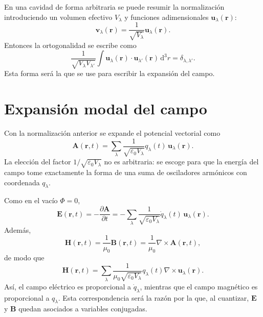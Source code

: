 \documentclass[11pt]{article}
\newcommand{\dd}{\mathrm{d}}
\newcommand{\vb}[1]{\mathbf{#1}}
\begin{document}
En una cavidad de forma arbitraria se puede resumir la normalizaci\'on
introduciendo un volumen efectivo $V_\lambda$ y funciones adimensionales
$\vb u_\lambda(\vb r)$:
\begin{equation}
  \vb v_\lambda(\vb r)
  =
  \frac{1}{\sqrt{V_\lambda}}\vb u_\lambda(\vb r).
\end{equation}
Entonces la ortogonalidad se escribe como
\begin{equation}
  \frac{1}{\sqrt{V_\lambda V_{\lambda'}}}
  \int
  \vb u_\lambda(\vb r)\cdot
  \vb u_{\lambda'}(\vb r)\,\dd^3r
  =
  \delta_{\lambda,\lambda'}.
\end{equation}
Esta forma ser\'a la que se use para escribir la expansi\'on del campo.

\section{Expansi\'on modal del campo}

Con la normalizaci\'on anterior se expande el potencial vectorial como
\begin{equation}
  \vb A(\vb r,t)
  =
  \sum_\lambda
  \frac{1}{\sqrt{\varepsilon_0V_\lambda}}
  q_\lambda(t)\,
  \vb u_\lambda(\vb r).
\end{equation}
La elecci\'on del factor $1/\sqrt{\varepsilon_0V_\lambda}$ no es arbitraria:
se escoge para que la energ\'ia del campo tome exactamente la forma de una
suma de osciladores arm\'onicos con coordenada $q_\lambda$.

Como en el vac\'io $\Phi=0$,
\begin{equation}
  \vb E(\vb r,t)
  =
  -\frac{\partial\vb A}{\partial t}
  =
  -\sum_\lambda
  \frac{1}{\sqrt{\varepsilon_0V_\lambda}}
  \dot q_\lambda(t)\,
  \vb u_\lambda(\vb r).
\end{equation}
Adem\'as,
\begin{equation}
  \vb H(\vb r,t)
  =
  \frac{1}{\mu_0}\vb B(\vb r,t)
  =
  \frac{1}{\mu_0}\nabla\times\vb A(\vb r,t),
\end{equation}
de modo que
\begin{equation}
  \vb H(\vb r,t)
  =
  \sum_\lambda
  \frac{1}{\mu_0\sqrt{\varepsilon_0V_\lambda}}
  q_\lambda(t)
  \nabla\times\vb u_\lambda(\vb r).
\end{equation}
As\'i, el campo el\'ectrico es proporcional a $\dot q_\lambda$, mientras que
el campo magn\'etico es proporcional a $q_\lambda$. Esta correspondencia ser\'a
la raz\'on por la que, al cuantizar, $\vb E$ y $\vb B$ quedan asociados a
variables conjugadas.
\end{document}
